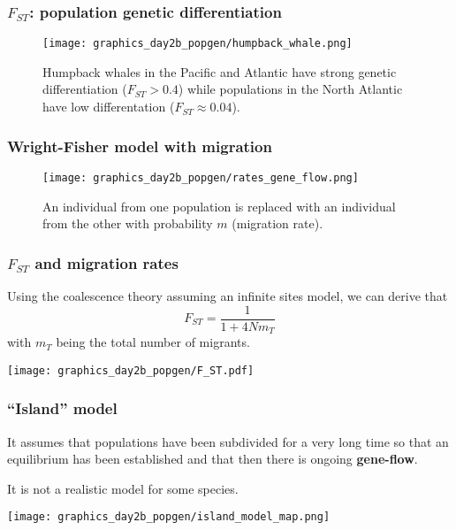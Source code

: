 \documentclass{beamer}
\newcommand{\1}{\ensuremath{\mathbf{1}}}
\begin{document}
%
%
%
\begin{frame}\frametitle{$F_{ST}$: population genetic differentiation}
	\begin{figure}
	\begin{center}
		\texttt{[image: graphics\_day2b\_popgen/humpback\_whale.png]}
	\end{center}
	\caption{Humpback whales in the Pacific and Atlantic have strong genetic differentiation ($F_{ST} > 0.4$) while populations in the North Atlantic have low differentation ($F_{ST} \approx 0.04$).}
	\end{figure}
\end{frame}
%
%
%
\begin{frame}\frametitle{Wright-Fisher model with migration}
	\begin{figure}
	\begin{center}
		\texttt{[image: graphics\_day2b\_popgen/rates\_gene\_flow.png]}
	\end{center}
	\caption{An individual from one population is replaced with an individual from the other with probability $m$ (migration rate).}
	\end{figure}
\end{frame}
%
%
%
\begin{frame}\frametitle{$F_{ST}$ and migration rates}
	Using the coalescence theory assuming an infinite sites model, we can derive that
	\begin{equation}
		F_{ST} = \frac{1}{1 + 4Nm_T}
	\end{equation}
	with $m_T$ being the total number of migrants.
	\begin{center}
		\texttt{[image: graphics\_day2b\_popgen/F\_ST.pdf]}
	\end{center}
\end{frame}
%
%
%
\begin{frame}\frametitle{``Island'' model}
	\begin{block}{}
		It assumes that populations have been subdivided for a very long time so that an equilibrium has been established and that then there is ongoing \textbf{gene-flow}.
	\end{block}
	It is not a realistic model for some species.
	\begin{center}
		\texttt{[image: graphics\_day2b\_popgen/island\_model\_map.png]}
	\end{center}
\end{frame}
\end{document}
